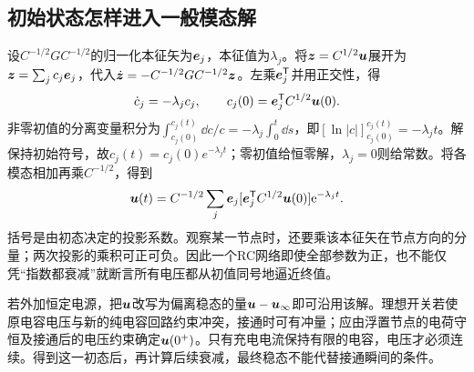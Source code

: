 \subsection{初始状态怎样进入一般模态解}
设$C^{-1/2}GC^{-1/2}$的归一化本征矢为$\bm{e}_j$，本征值为$\lambda_j$。将$\bm{z}=C^{1/2}\bm{u}$展开为$\bm{z}=\sum_j c_j\bm{e}_j$，代入$\dot{\bm{z}}=-C^{-1/2}GC^{-1/2}\bm{z}$。左乘$\bm{e}_j^{\mathsf T}$并用正交性，得
\[\dot c_j=-\lambda_jc_j,\qquad
c_j(0)=\bm{e}_j^{\mathsf T}C^{1/2}\bm{u}(0).\]
非零初值的分离变量积分为$\int_{c_j(0)}^{c_j(t)}\dd c/c=-\lambda_j\int_0^t\dd s$，即$[\ln|c|]_{c_j(0)}^{c_j(t)}=-\lambda_jt$。解保持初始符号，故$c_j(t)=c_j(0)e^{-\lambda_jt}$；零初值给恒零解，$\lambda_j=0$则给常数。将各模态相加再乘$C^{-1/2}$，得到
\[
 \bm{u}(t)=C^{-1/2}\sum_j\bm{e}_j
 [\bm{e}_j^{\mathsf T}C^{1/2}\bm{u}(0)]\mathrm e^{-\lambda_jt}.
\]
括号是由初态决定的投影系数。观察某一节点时，还要乘该本征矢在节点方向的分量；两次投影的乘积可正可负。因此一个RC网络即使全部参数为正，也不能仅凭“指数都衰减”就断言所有电压都从初值同号地逼近终值。

若外加恒定电源，把$\bm{u}$改写为偏离稳态的量$\bm{u}-\bm{u}_\infty$即可沿用该解。理想开关若使原电容电压与新的纯电容回路约束冲突，接通时可有冲量；应由浮置节点的电荷守恒及接通后的电压约束确定$\bm{u}(0^+)$。只有充电电流保持有限的电容，电压才必须连续。得到这一初态后，再计算后续衰减，最终稳态不能代替接通瞬间的条件。
